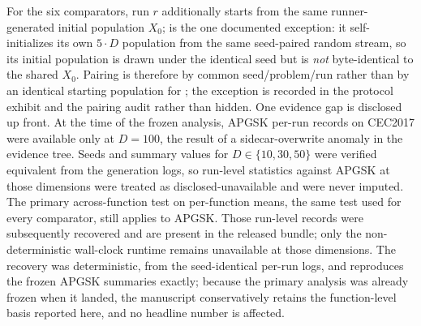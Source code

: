 For the six comparators, run $r$ additionally starts from the same
runner-generated initial population $X_{0}$; \dtgsk{} is the one
documented exception: it self-initializes its own $5 \cdot D$ population
from the same seed-paired random stream, so its initial population is drawn
under the identical seed but is \emph{not} byte-identical to the shared
$X_{0}$. Pairing is therefore by common seed/problem/run rather than by an
identical starting population for \dtgsk{}; the exception is recorded in
the protocol exhibit and the pairing audit rather than hidden.
One evidence gap is disclosed up front. At the time of the frozen analysis,
APGSK per-run records on CEC2017 were available only at $D = 100$, the
result of a sidecar-overwrite anomaly in the evidence tree. Seeds and
summary values for $D \in \{10, 30, 50\}$ were verified equivalent from the
generation logs, so run-level statistics against APGSK at those dimensions
were treated as disclosed-unavailable and were never imputed. The primary
across-function test on per-function means, the same test used for every
comparator, still applies to APGSK. Those run-level records were
subsequently recovered and are present in the released bundle; only the
non-deterministic wall-clock runtime remains unavailable at those
dimensions. The recovery was deterministic, from the seed-identical per-run logs, and reproduces the frozen APGSK summaries exactly; because the primary analysis was already frozen when it landed, the manuscript conservatively retains the function-level basis reported here, and no headline number is affected.



